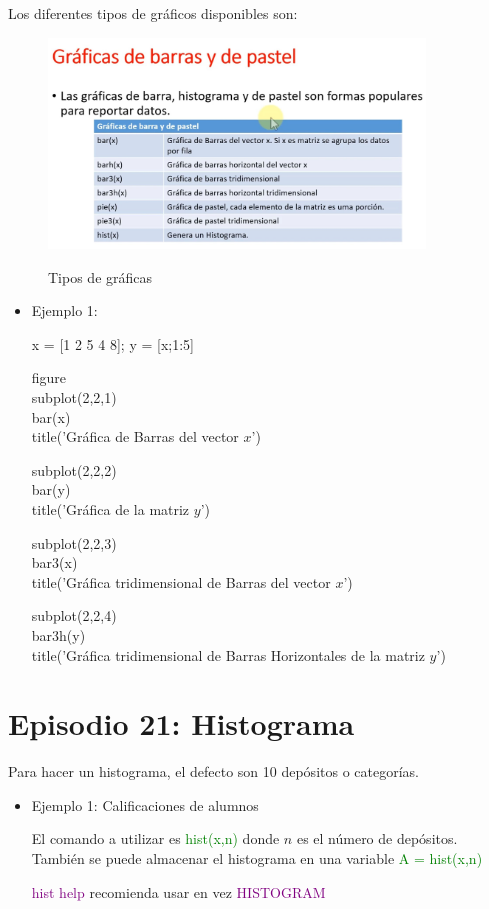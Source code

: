 \documentclass{article}
\begin{document}
	Los diferentes tipos de gráficos disponibles son:
	
	\begin{figure}[h!]
		\centering
		\includegraphics[width = 100mm]{imagenes/Funciones/barras}
		\label{barras}
		\caption{Tipos de gráficas}
	\end{figure}

	\begin{itemize}
		\item Ejemplo 1:
		
		x = [1 2 5 4 8];
		y = [x;1:5]
		
		figure\\
		subplot(2,2,1)\\
		bar(x)\\
		title('Gráfica de Barras del vector $x$')
		
		subplot(2,2,2)\\
		bar(y)\\
		title('Gráfica de la matriz $y$')
		
		subplot(2,2,3)\\
		bar3(x)\\
		title('Gráfica tridimensional de Barras del vector $x$')
		
		subplot(2,2,4)\\
		bar3h(y)\\
		title('Gráfica tridimensional de Barras Horizontales de la matriz $y$')
		
	\end{itemize}
	
	\section{Episodio 21: Histograma}
	
	Para hacer un histograma, el defecto son 10 depósitos o categorías.
	
	\begin{itemize}
		\item Ejemplo 1: Calificaciones de alumnos
		
	El comando a utilizar es \textcolor{green}{hist(x,n)} donde $n$ es el número de depósitos. También se puede almacenar el histograma en una variable \textcolor{green}{A = hist(x,n)}
	
	\textcolor{purple}{hist help} recomienda usar en vez \textcolor{purple}{HISTOGRAM}
	\end{itemize}
\end{document}

